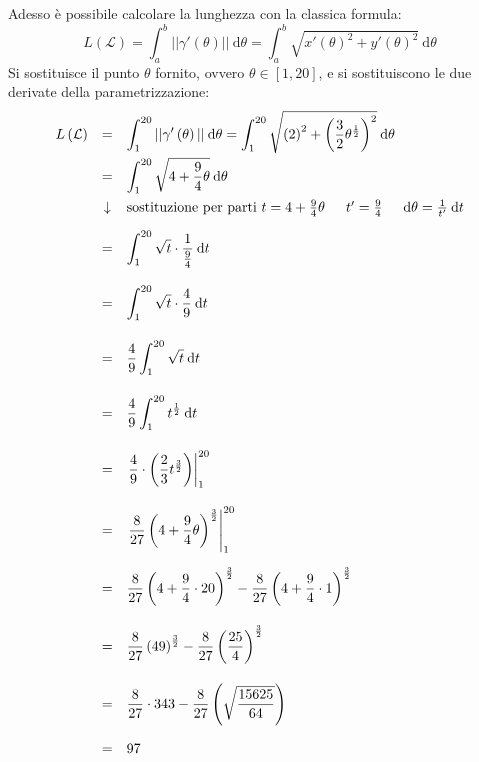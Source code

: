 \documentclass[a4paper]{article}
\begin{document}
	\noindent
	Adesso è possibile calcolare la lunghezza con la classica formula:
	\begin{equation*}
		L\left(\mathcal{L}\right) = \displaystyle\int_{a}^{b} || \gamma'\left(\theta\right) || \: \mathrm{d}\theta = \displaystyle\int_{a}^{b} \sqrt{x'\left(\theta\right)^{2} + y'\left(\theta\right)^{2}} \: \mathrm{d}\theta
	\end{equation*}
	Si sostituisce il punto $\theta$ fornito, ovvero $\theta \in \left[1,20\right]$, e si sostituiscono le due derivate della parametrizzazione:
	\begin{equation*}
		\begin{array}{lcl}
			L\left(\mathcal{L}\right) &=& \displaystyle\int_{1}^{20} || \gamma'\left(\theta\right) || \: \mathrm{d}\theta = \displaystyle\int_{1}^{20} \sqrt{\left(2\right)^{2} + \left(\dfrac{3}{2}\theta^{\frac{1}{2}}\right)^{2}} \: \mathrm{d}\theta \\ [1em]
			&=& \displaystyle\int_{1}^{20} \sqrt{4 + \dfrac{9}{4}\theta} \: \mathrm{d}\theta \\ [1em]
			&\downarrow& \text{sostituzione per parti } t = 4+\frac{9}{4}\theta \hspace{1.5em} t' = \frac{9}{4} \hspace{1.5em} \mathrm{d}\theta = \frac{1}{t'} \:\mathrm{d}t \\ [1em]
			&=& \displaystyle\int_{1}^{20} \sqrt{t} \cdot \dfrac{1}{\frac{9}{4}} \: \mathrm{d}t \\ [2em]
			&=& \displaystyle\int_{1}^{20} \sqrt{t} \cdot \dfrac{4}{9} \: \mathrm{d}t \\ [2em]
			&=& \dfrac{4}{9}\displaystyle\int_{1}^{20} \sqrt{t} \: \mathrm{d}t \\ [2em]
			&=& \dfrac{4}{9}\displaystyle\int_{1}^{20} t^{\frac{1}{2}} \: \mathrm{d}t \\ [2em]
			&=& \left. \dfrac{4}{9} \cdot \left(\dfrac{2}{3} t^{\frac{3}{2}}\right) \right|_{1}^{20} \\ [2em]
			&=& \left. \dfrac{8}{27}\left(4 + \dfrac{9}{4}\theta\right)^{\frac{3}{2}} \right|_{1}^{20} \\ [2em]
			&=& \dfrac{8}{27}\left(4 + \dfrac{9}{4} \cdot 20\right)^{\frac{3}{2}} - \dfrac{8}{27}\left(4 + \dfrac{9}{4} \cdot 1\right)^{\frac{3}{2}} \\ [2em]
			&=& \dfrac{8}{27}\left(49\right)^{\frac{3}{2}} - \dfrac{8}{27}\left(\dfrac{25}{4}\right)^{\frac{3}{2}} \\ [2em]
			&=& \dfrac{8}{27} \cdot 343 - \dfrac{8}{27}\left(\sqrt{\dfrac{15625}{64}}\right) \\ [2em]
			&=& 97
		\end{array}
	\end{equation*}
\end{document}
